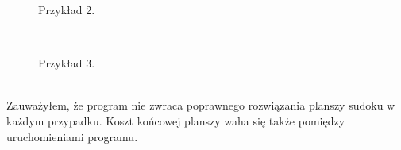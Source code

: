 \documentclass{article}
\begin{document}
        \begin{figure}[h!]
            \centering
            \caption{Przykład 2.}
        \end{figure}\\
        \begin{figure}[h!]
            \centering
            \caption{Przykład 3.}
        \end{figure}\\
        
        
        \FloatBarrier 
        Zauważyłem, że program nie zwraca poprawnego rozwiązania planszy sudoku w każdym przypadku. Koszt końcowej planszy waha się także pomiędzy uruchomieniami programu. 
\end{document}
